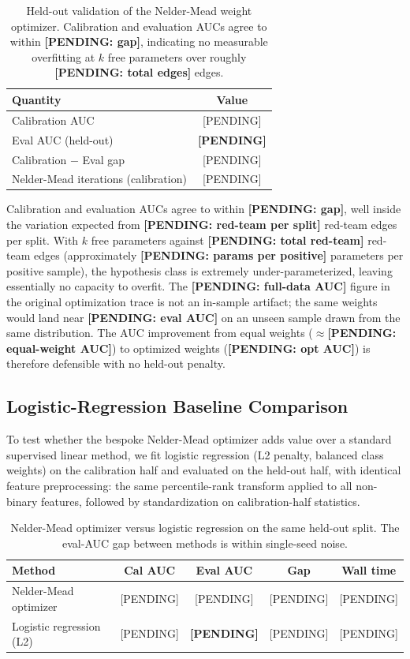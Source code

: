 \begin{table}[h]
\centering
\begin{tabular}{lc}
\hline
Quantity & Value \\
\hline
Calibration AUC & [PENDING] \\
Eval AUC (held-out) & \textbf{[PENDING]} \\
Calibration $-$ Eval gap & [PENDING] \\
Nelder-Mead iterations (calibration) & [PENDING] \\
\hline
\end{tabular}
\caption{Held-out validation of the Nelder-Mead weight optimizer. Calibration and evaluation AUCs agree to within \textbf{[PENDING: gap]}, indicating no measurable overfitting at $k$ free parameters over roughly \textbf{[PENDING: total edges]} edges.}
\label{tab:holdout_optimizer}
\end{table}

Calibration and evaluation AUCs agree to within \textbf{[PENDING: gap]}, well inside the variation expected from \textbf{[PENDING: red-team per split]} red-team edges per split. With $k$ free parameters against \textbf{[PENDING: total red-team]} red-team edges (approximately \textbf{[PENDING: params per positive]} parameters per positive sample), the hypothesis class is extremely under-parameterized, leaving essentially no capacity to overfit. The \textbf{[PENDING: full-data AUC]} figure in the original optimization trace is not an in-sample artifact; the same weights would land near \textbf{[PENDING: eval AUC]} on an unseen sample drawn from the same distribution. The AUC improvement from equal weights ($\approx$\textbf{[PENDING: equal-weight AUC]}) to optimized weights (\textbf{[PENDING: opt AUC]}) is therefore defensible with no held-out penalty.


\subsection{Logistic-Regression Baseline Comparison}
\label{sec:lr_baseline}

To test whether the bespoke Nelder-Mead optimizer adds value over a standard supervised linear method, we fit logistic regression (L2 penalty, balanced class weights) on the calibration half and evaluated on the held-out half, with identical feature preprocessing: the same percentile-rank transform applied to all non-binary features, followed by standardization on calibration-half statistics.

\begin{table}[h]
\centering
\begin{tabular}{lcccc}
\hline
Method & Cal AUC & Eval AUC & Gap & Wall time \\
\hline
Nelder-Mead optimizer   & [PENDING] & [PENDING] & [PENDING] & [PENDING] \\
Logistic regression (L2) & [PENDING] & \textbf{[PENDING]} & [PENDING] & [PENDING] \\
\hline
\end{tabular}
\caption{Nelder-Mead optimizer versus logistic regression on the same held-out split. The eval-AUC gap between methods is within single-seed noise.}
\label{tab:lr_comparison}
\end{table}

